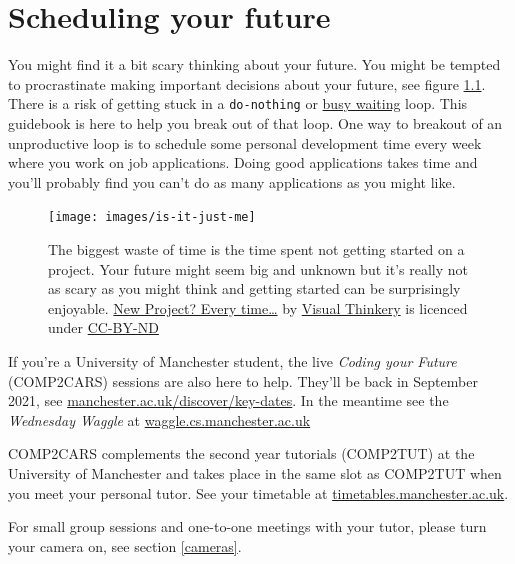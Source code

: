 \documentclass[
]{book}
\begin{document}
\hypertarget{scheduling}{%
\chapter{Scheduling your future}\label{scheduling}}

You might find it a bit scary thinking about your future. You might be tempted to procrastinate making important decisions about your future, see figure \ref{fig:schedule-fig}. There is a risk of getting stuck in a \texttt{do-nothing} or \href{https://en.wikipedia.org/wiki/Busy_waiting}{busy waiting} loop. This guidebook is here to help you break out of that loop. One way to breakout of an unproductive loop is to schedule some personal development time every week where you work on job applications. Doing good applications takes time and you'll probably find you can't do as many applications as you might like.

\begin{figure}

{\centering \texttt{[image: images/is-it-just-me]} 

}

\caption{The biggest waste of time is the time spent not getting started on a project. Your future might seem big and unknown but it's really not as scary as you might think and getting started can be surprisingly enjoyable. \href{https://bryanmmathers.com/new-project-every-time/}{New Project? Every time\ldots{}} by \href{https://visualthinkery.com/}{Visual Thinkery} is licenced under \href{https://creativecommons.org/licenses/by-nd/4.0/}{CC-BY-ND}}\label{fig:schedule-fig}
\end{figure}



If you're a University of Manchester student, the live \emph{Coding your Future} (COMP2CARS) sessions are also here to help. They'll be back in September 2021, see \href{https://www.manchester.ac.uk/discover/key-dates/}{manchester.ac.uk/discover/key-dates}. In the meantime see the \emph{Wednesday Waggle} at \href{https://waggle.cs.manchester.ac.uk/}{waggle.cs.manchester.ac.uk}

COMP2CARS complements the second year tutorials (COMP2TUT) at the University of Manchester and takes place in the same slot as COMP2TUT when you meet your personal tutor. See your timetable at \href{https://timetables.manchester.ac.uk/}{timetables.manchester.ac.uk}.

For small group sessions and one-to-one meetings with your tutor, please turn your camera on, see section \ref{cameras}.
\end{document}
